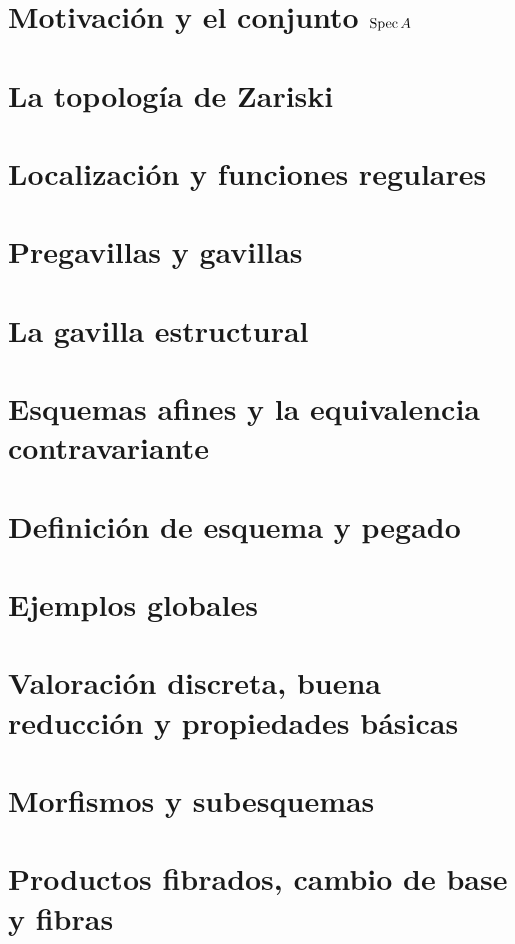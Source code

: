 \clearpage
{}
{}
\thispagestyle{plain}
\par
\vspace{3em}


\chapter{Motivación y el conjunto \texorpdfstring{$\operatorname{Spec} A$}{Spec A}}


\chapter{La topología de Zariski}


\chapter{Localización y funciones regulares}


\chapter{Pregavillas y gavillas}


\chapter{La gavilla estructural}


\chapter{Esquemas afines y la equivalencia contravariante}


\chapter{Definición de esquema y pegado}


\chapter{Ejemplos globales}


\chapter{Valoración discreta, buena reducción y propiedades básicas}


\chapter{Morfismos y subesquemas}


\chapter{Productos fibrados, cambio de base y fibras}

